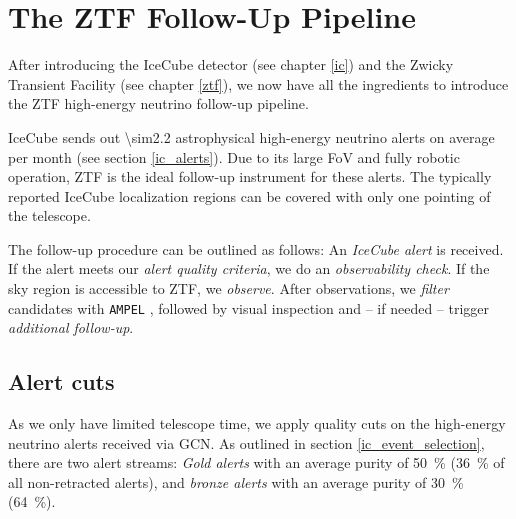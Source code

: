 \documentclass[
    a4paper, %
    fontsize=10pt, %
    twoside=true, %
    numbers=noenddot, %
    fontmethod=tex,
]{kaobook}
\begin{document}

\tableofcontents
\listoffigures

\let\cleardoublepage\bigskip
\let\clearpage\bigskip

\listoftables

\endgroup

\mainmatter
{}






\chapter{The ZTF Follow-Up Pipeline} 
After introducing the IceCube detector (see chapter \ref{ic}) and the Zwicky Transient Facility (see chapter \ref{ztf}), we now have all the ingredients to introduce the ZTF high-energy neutrino follow-up pipeline.

IceCube sends out \num{\sim2.2} astrophysical high-energy neutrino alerts on average per month (see section \ref{ic_alerts}). Due to its large FoV and fully robotic operation, ZTF is the ideal follow-up instrument for these alerts. The typically reported IceCube localization regions can be covered with only one pointing of the telescope.

The follow-up procedure can be outlined as follows: An \textit{IceCube alert} is received. If the alert meets our \textit{alert quality criteria}, we do an \textit{observability check}. If the sky region is accessible to ZTF, we \textit{observe}. After observations, we \textit{filter} candidates with \texttt{AMPEL} , followed by visual inspection and -- if needed -- trigger \textit{additional follow-up}.

\section{Alert cuts}\label{alert_cuts}
As we only have limited telescope time, we apply quality cuts on the high-energy neutrino alerts received via GCN. As outlined in section \ref{ic_event_selection}, there are two alert streams: \textit{Gold alerts} with an average purity of \SI{50}{\percent} (\SI{36}{\percent} of all non-retracted alerts), and \textit{bronze alerts} with an average purity of \SI{30}{\percent} (\SI{64}{\percent}).
\end{document}
